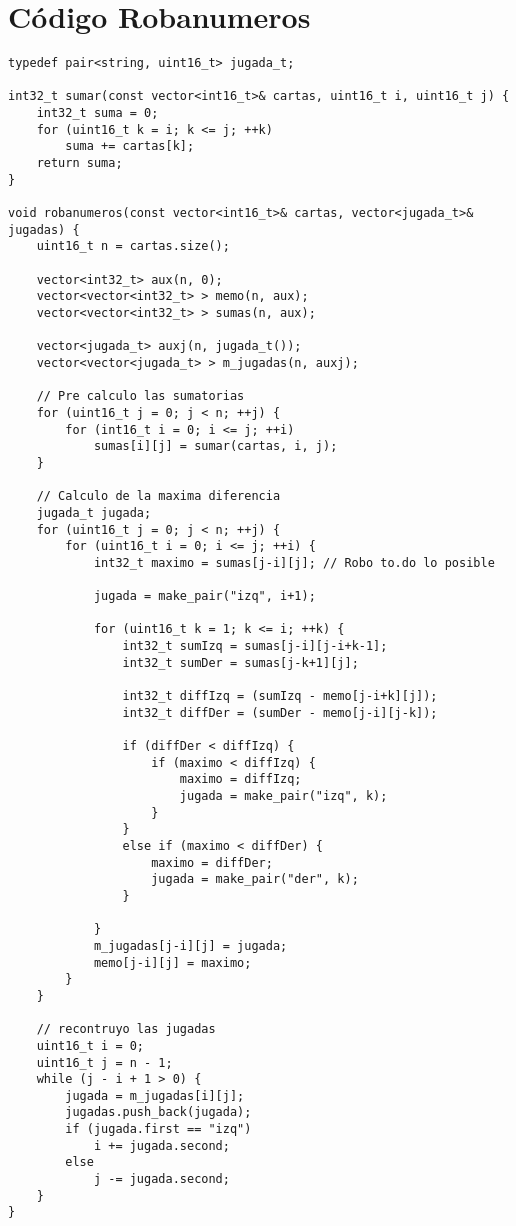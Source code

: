 \appendix



\section{Código Robanumeros} \label{App:AppendixA}

\begin{frame}

\begin{lstlisting}
typedef pair<string, uint16_t> jugada_t;

int32_t sumar(const vector<int16_t>& cartas, uint16_t i, uint16_t j) {
	int32_t suma = 0;
	for (uint16_t k = i; k <= j; ++k)
		suma += cartas[k];
	return suma;
}

void robanumeros(const vector<int16_t>& cartas, vector<jugada_t>& jugadas) {	
	uint16_t n = cartas.size();

	vector<int32_t> aux(n, 0);
	vector<vector<int32_t> > memo(n, aux);
	vector<vector<int32_t> > sumas(n, aux);

	vector<jugada_t> auxj(n, jugada_t());
	vector<vector<jugada_t> > m_jugadas(n, auxj);

	// Pre calculo las sumatorias
	for (uint16_t j = 0; j < n; ++j) {
		for (int16_t i = 0; i <= j; ++i)
			sumas[i][j] = sumar(cartas, i, j);
	}

	// Calculo de la maxima diferencia
	jugada_t jugada;
	for (uint16_t j = 0; j < n; ++j) {
		for (uint16_t i = 0; i <= j; ++i) {
			int32_t maximo = sumas[j-i][j]; // Robo to.do lo posible

			jugada = make_pair("izq", i+1);

			for (uint16_t k = 1; k <= i; ++k) {
				int32_t sumIzq = sumas[j-i][j-i+k-1];
				int32_t sumDer = sumas[j-k+1][j];

				int32_t diffIzq = (sumIzq - memo[j-i+k][j]);
				int32_t diffDer = (sumDer - memo[j-i][j-k]);

				if (diffDer < diffIzq) {
					if (maximo < diffIzq) {
						maximo = diffIzq;
						jugada = make_pair("izq", k);
					}
				}
				else if (maximo < diffDer) {
					maximo = diffDer;
					jugada = make_pair("der", k);
				}

			}
			m_jugadas[j-i][j] = jugada;
			memo[j-i][j] = maximo;
		}
	}

	// recontruyo las jugadas
	uint16_t i = 0;
	uint16_t j = n - 1;
	while (j - i + 1 > 0) {
		jugada = m_jugadas[i][j];
		jugadas.push_back(jugada);
		if (jugada.first == "izq")
			i += jugada.second;
		else
			j -= jugada.second;
	}
}

\end{lstlisting}
\end{frame}

